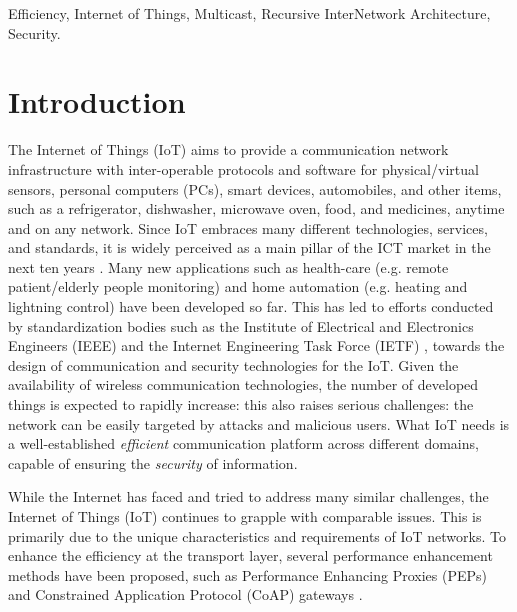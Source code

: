 \documentclass{ieeeaccess}
\begin{document}
\begin{keywords}
Efficiency, Internet of Things, Multicast, Recursive InterNetwork Architecture, Security.
\end{keywords}

\titlepgskip=-21pt

\maketitle

\section{Introduction}
\label{sec:intro}
The Internet of Things (IoT) aims to provide a communication network infrastructure with inter-operable protocols and software for physical/virtual sensors, personal computers (PCs), smart devices, automobiles, and other items, such as a refrigerator, dishwasher, microwave oven, food, and medicines, anytime and on any network. Since IoT embraces many different technologies, services, and standards, it is widely perceived as a main pillar of the ICT market in the next ten years \cite{Alaba201710}. Many new applications such as health-care (e.g. remote patient/elderly people monitoring) and home automation (e.g. heating and lightning control) have been developed so far. This has led to efforts conducted by standardization bodies such as the Institute of Electrical and Electronics Engineers (IEEE) and the Internet Engineering Task Force (IETF) \cite{rfc8576}, towards the design of communication and security technologies for the IoT. Given the availability of wireless communication technologies, the number of developed things is expected to rapidly increase: this also raises serious challenges: the network can be easily targeted by attacks and malicious users. What IoT needs is a well-established \textit{efficient} communication platform across different domains, capable of ensuring the \textit{security} of information.


While the Internet has faced and tried to address many similar challenges, the Internet of Things (IoT) continues to grapple with comparable issues. This is primarily due to the unique characteristics and requirements of IoT networks. To enhance the efficiency at the transport layer, several performance enhancement methods have been proposed, such as Performance Enhancing Proxies (PEPs) \cite{caini2007pepsal} and Constrained Application Protocol (CoAP) gateways \cite{rfc7252}.
\end{document}
